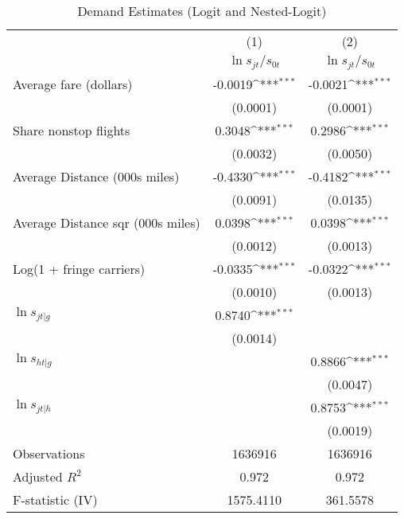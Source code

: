 \begin{table}[htbp]\centering
\def\sym#1{\ifmmode^{#1}\else\(^{#1}\)\fi}
\caption{Demand Estimates (Logit and Nested-Logit)}
\begin{tabular}{l*{2}{c}}
\toprule
                    &\multicolumn{1}{c}{(1)}&\multicolumn{1}{c}{(2)}\\
                    &\multicolumn{1}{c}{$\ln s_{jt}/s_{0t}$}&\multicolumn{1}{c}{$\ln s_{jt}/s_{0t}$}\\
\midrule
Average fare (dollars)&     -0.0019\sym{***}&     -0.0021\sym{***}\\
                    &    (0.0001)         &    (0.0001)         \\
\addlinespace
Share nonstop flights &      0.3048\sym{***}&      0.2986\sym{***}\\
                    &    (0.0032)         &    (0.0050)         \\
\addlinespace
Average Distance (000s miles)&     -0.4330\sym{***}&     -0.4182\sym{***}\\
                    &    (0.0091)         &    (0.0135)         \\
\addlinespace
Average Distance sqr (000s miles)&      0.0398\sym{***}&      0.0398\sym{***}\\
                    &    (0.0012)         &    (0.0013)         \\
\addlinespace
Log(1 + fringe carriers)&     -0.0335\sym{***}&     -0.0322\sym{***}\\
                    &    (0.0010)         &    (0.0013)         \\
\addlinespace
$\ln s_{jt|g}$      &      0.8740\sym{***}&                     \\
                    &    (0.0014)         &                     \\
\addlinespace
$\ln s_{ht|g}$      &                     &      0.8866\sym{***}\\
                    &                     &    (0.0047)         \\
\addlinespace
$\ln s_{jt|h}$      &                     &      0.8753\sym{***}\\
                    &                     &    (0.0019)         \\
\midrule
Observations        &     1636916         &     1636916         \\
Adjusted \(R^{2}\)  &       0.972         &       0.972         \\
F-statistic (IV)    &   1575.4110         &    361.5578         \\
\bottomrule
\end{tabular}
\end{table}
